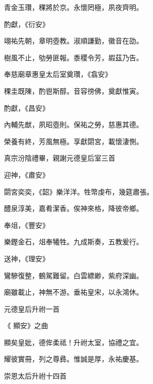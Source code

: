 \begin{pinyinscope}
 青金玉瓚，稞將於京。永懷罔極，夙夜齊明。



 酌獻，《衍安》



 翊祐先朝，章明壺教。淑順謙勤，徽音在劭。



 樹風不止，劬勞匪報。黍稷令芳，嘏茲乃告。



 奉慈廟章惠皇太后室奠瓚，《翕安》



 稞圭既陳，酌鬯斯醇。音容徬佛，奠獻惟寅。



 酌獻，《昌安》



 內輔先猷，夙昭壺則。保祐之勞，慈惠其德。



 榮養有終，芳風無極。享獻閟宮，載懷淒惻。



 真宗汾陰禮畢，親謝元德皇后室三首



 迎神，《肅安》



 閟宮奕奕，《韶》樂洋洋。牲幣虔布，幾筵肅張。



 醴泉淳美，嘉肴潔香。俟神來格，降彼帝鄉。



 奉俎，《豐安》



 樂鏗金石，俎奉犧牲。九成斯奏，五教爰行。



 送神，《理安》



 鸞驂復整，鶴駕難留。白雲縹緲，紫府深幽。



 廟雖載止，神無不游。垂祐皇宋，以永鴻休。



 元德皇后升祔一首



 《
 顯安》之曲



 顯矣皇妣，德侔柔祗！升祔太室，協禮之宜。



 耀彼實冊，列之尊彞。惟誠是厚，永祐慶基。



 崇恩太后升祔十四首




\end{pinyinscope}
